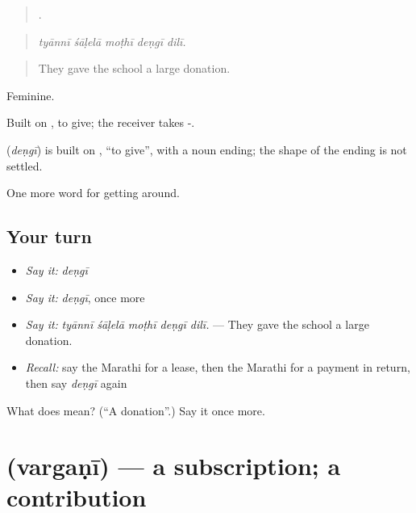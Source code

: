 \begin{quote}
    .
\end{quote}

\begin{quote}
\emph{tyānnī śāḷelā moṭhī deṇgī dilī.}
\end{quote}

\begin{quote}
They gave the school a large donation.
\end{quote}

Feminine.

Built on , to give; the receiver takes -.

\begin{cousinweb}
\textbf{} (\emph{deṇgī}) is built on \textbf{}, \textquotedblleft{}to give\textquotedblright{}, with a noun ending; the shape of the ending is not settled.
\end{cousinweb}

\begin{grammarlens}[title={What you've built}]
One more word for getting around.
\end{grammarlens}

\subsection*{Your turn}
\begin{itemize}
\raggedright
  \item \emph{Say it:} \emph{deṇgī}
  \item \emph{Say it:} \emph{deṇgī}, once more
  \item \emph{Say it:} \emph{tyānnī śāḷelā moṭhī deṇgī dilī.} — They gave the school a large donation.
  \item \emph{Recall:} say the Marathi for a lease, then the Marathi for a payment in return, then say \emph{deṇgī} again
\end{itemize}

\begin{tcolorbox}[breakable,colback=teal!4,colframe=teal!35!black,title={Before you move on}]
What does  mean? (\textquotedblleft{}A donation\textquotedblright{}.) Say it once more.
\end{tcolorbox}
\section[\texorpdfstring{\mr{वर्गणी} (vargaṇī)}{वर्गणी (vargaṇī)}]{ (vargaṇī) — a subscription; a contribution}

